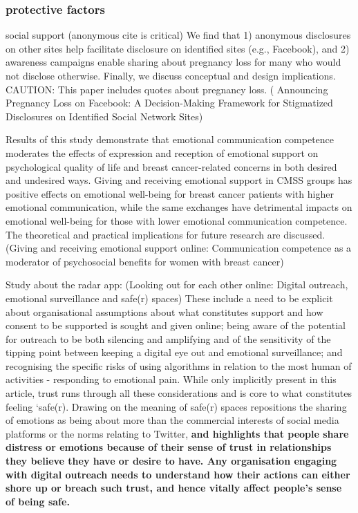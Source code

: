 \subsubsection{protective factors}

social support (anonymous cite is critical) We find that 1) anonymous disclosures on other sites help facilitate disclosure on identified sites (e.g., Facebook), and 2) awareness campaigns enable sharing about pregnancy loss for many who would not disclose otherwise. Finally, we discuss conceptual and design implications. CAUTION: This paper includes quotes about pregnancy loss. (
Announcing Pregnancy Loss on Facebook: A Decision-Making Framework for Stigmatized Disclosures on Identified Social Network Sites)


Results of this study demonstrate that emotional communication competence moderates the effects of expression and reception of emotional support on psychological quality of life and breast cancer-related concerns in both desired and undesired ways. Giving and receiving emotional support in CMSS groups has positive effects on emotional well-being for breast cancer patients with higher emotional communication, while the same exchanges have detrimental impacts on emotional well-being for those with lower emotional communication competence. The theoretical and practical implications for future research are discussed.(Giving and receiving emotional support online: Communication competence as a moderator of psychosocial benefits for women with breast cancer)

Study about the radar app:
(Looking out for each other online: Digital outreach, emotional surveillance and safe(r) spaces)
These include a need to be explicit about organisational assumptions about what constitutes support and how consent to be supported is sought and given online; being aware of the potential for outreach to be both silencing and amplifying and of the sensitivity of the tipping point between keeping a digital eye out and emotional surveillance; and recognising the specific risks of using algorithms in relation to the most human of activities - responding to emotional pain. While only implicitly present in this article, trust runs through all these considerations and is core to what constitutes feeling ‘safe(r). Drawing on the meaning of safe(r) spaces repositions the sharing of emotions as being about more than the commercial interests of social media platforms or the norms relating to Twitter, \textbf{and highlights that people share distress or emotions because of their sense of trust in relationships they believe they have or desire to have. Any organisation engaging with digital outreach needs to understand how their actions can either shore up or breach such trust, and hence vitally affect people's sense of being safe.}


